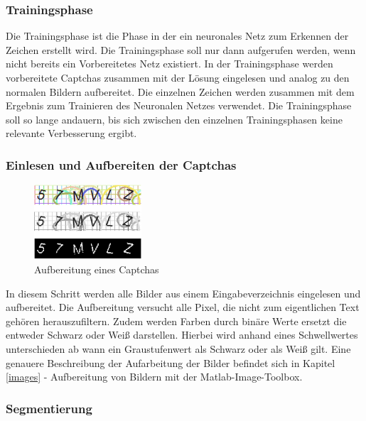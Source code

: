 \subsubsection{Trainingsphase}

Die Trainingsphase ist die Phase in der ein neuronales Netz zum Erkennen der
Zeichen erstellt wird. Die Trainingsphase soll nur dann aufgerufen werden, wenn
nicht bereits ein Vorbereitetes Netz existiert. In der Trainingsphase werden
vorbereitete Captchas zusammen mit der Lösung eingelesen und analog zu den
normalen Bildern aufbereitet. Die einzelnen Zeichen werden zusammen mit dem
Ergebnis zum Trainieren des Neuronalen Netzes verwendet. Die Trainingsphase
soll so lange andauern, bis sich zwischen den einzelnen Trainingsphasen keine
relevante Verbesserung ergibt.

\subsubsection{Einlesen und Aufbereiten der Captchas}

\begin{figure}
  \begin{center}
  \vspace{-48pt}
    \includegraphics[width=4cm]{res/Aufbereitung.png}
  \end{center}
  \caption{Aufbereitung eines Captchas}
\end{figure}

In diesem Schritt werden alle Bilder aus einem Eingabeverzeichnis eingelesen und
aufbereitet. Die Aufbereitung versucht alle Pixel, die nicht zum eigentlichen
Text gehören herauszufiltern. Zudem werden Farben durch binäre Werte ersetzt
die entweder Schwarz oder Weiß darstellen. Hierbei wird anhand eines
Schwellwertes unterschieden ab wann ein Graustufenwert als Schwarz oder als
Weiß gilt. Eine genauere Beschreibung der Aufarbeitung der Bilder befindet sich
in Kapitel \ref{images} - Aufbereitung von Bildern mit der Matlab-Image-Toolbox.


\subsubsection{Segmentierung}
\label{segment}

